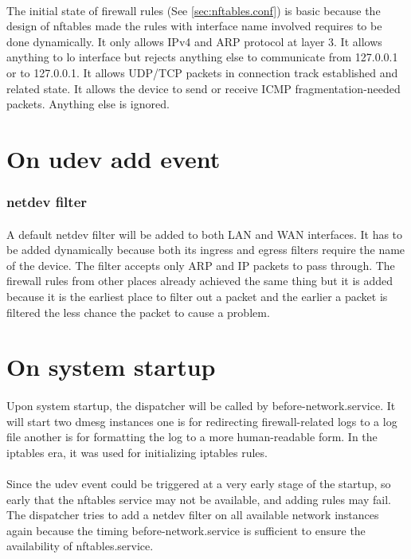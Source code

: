 \documentclass[mscthesis]{usiinfthesis}
\begin{document}
\paragraph{}
The initial state of firewall rules (See \cref{sec:nftables.conf}) is basic because the design of nftables made the rules with interface name involved requires to be done dynamically. It only allows IPv4 and ARP protocol at layer 3. It allows anything to lo interface but rejects anything else to communicate from 127.0.0.1 or to 127.0.0.1. It allows UDP/TCP packets in connection track established and related
state. It allows the device to send or receive ICMP fragmentation-needed packets. Anything else is ignored.

\section{On udev add event}
\subsubsection{netdev filter}
\paragraph{}
A default netdev filter will be added to both LAN and WAN interfaces. It has to be added dynamically because both its ingress and egress filters require the name of the device. The filter accepts only ARP and IP packets to pass through. The firewall rules from other places already achieved the same thing but it is added because it is the earliest place to filter out a packet and the earlier a packet is filtered the less chance the packet to cause a problem.

\section{On system startup}
\paragraph{}
Upon system startup, the dispatcher will be called by before-network.service. It will start two dmesg instances one is for redirecting firewall-related logs to a log file another is for formatting the log to a more human-readable form. In the iptables era, it was used for initializing iptables rules.
\paragraph{}
Since the udev event could be triggered at a very early stage of the startup, so early that the nftables service may not be available, and adding rules may fail. The dispatcher tries to add a netdev filter on all available network instances again because the timing before-network.service is sufficient to ensure the availability of nftables.service.
\end{document}
